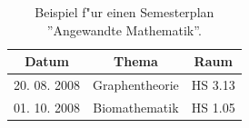 \begin{table}[htbp]
\centering
\caption[Semesterplan ''Angewandte Mathematik''.]{Beispiel f"ur einen 
Semesterplan ''Angewandte Mathematik''.}
\begin{tabular}{ccc}\hline
\textbf{Datum} & \textbf{Thema} & \textbf{Raum}\\ \hline
\hline
20. 08. 2008 & Graphentheorie & HS 3.13\\ 
01. 10. 2008 & Biomathematik & HS 1.05\\ \hline
\end{tabular}
\label{tab-mathe}
\end{table}

